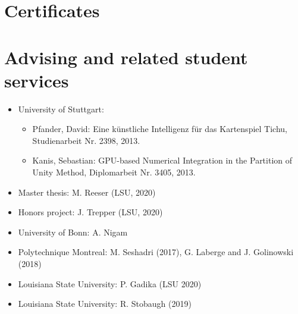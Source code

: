 \documentclass[11pt,a4paper,sans]{moderncv}
\begin{document}
\section{Certificates}

\section{Advising and related student services}
\begin{itemize}[leftmargin=4cm]
\item University of Stuttgart:
\begin{itemize}
\item Pfander, David: Eine künstliche Intelligenz für das Kartenspiel Tichu, Studienarbeit Nr. 2398, 2013.
\item Kanis, Sebastian: GPU-based Numerical Integration in the Partition of Unity Method, Diplomarbeit Nr. 3405, 2013.
\end{itemize}
\end{itemize}

\begin{itemize}[leftmargin=4cm]
\item Master thesis: M. Reeser (LSU, 2020)
\item Honors project: J. Trepper (LSU, 2020)
\end{itemize}

\begin{itemize}[leftmargin=4cm]
\item University of Bonn: A. Nigam
\item Polytechnique Montreal:  M. Seshadri (2017), G. Laberge and J. Golinowski (2018)
\item Louisiana State University: P. Gadika (LSU 2020)
\end{itemize}

\begin{itemize}[leftmargin=4cm]
\item Louisiana State University: R. Stobaugh (2019)
\end{itemize}
\end{document}
